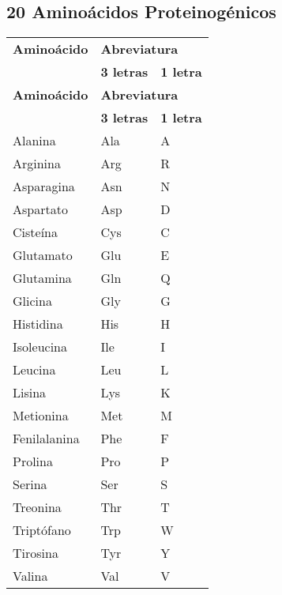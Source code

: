 \subsection*{20 Amino\'{a}cidos Proteinog\'{e}nicos} 
\begin{longtable}[l]{|l|l|l|}\hline
   \textbf{Amino\'{a}cido} & \multicolumn{2}{|l|}{\textbf{Abreviatura}} \\
  \cline{2-3}
  &\textbf{3 letras}&\textbf{1 letra}\\[0.5ex] \hline%
  \endfirsthead%
 \textbf{Amino\'{a}cido} & \multicolumn{2}{|l|}{\textbf{Abreviatura}} \\
  \cline{2-3}
  &\textbf{3 letras}&\textbf{1 letra}\\[0.5ex] \hline%
 \endhead%
\renewcommand{\arraystretch}{1.4}\label{amino}
Alanina&Ala&A\\
Arginina&Arg&R\\
Asparagina&Asn&N\\
Aspartato&Asp&D\\
Ciste\'{i}na&Cys&C\\
Glutamato&Glu&E\\
Glutamina&Gln&Q\\
Glicina&Gly&G\\
Histidina&His&H\\
Isoleucina&Ile&I\\
Leucina&Leu&L\\
Lisina&Lys&K\\
Metionina&Met&M\\
Fenilalanina&Phe&F\\
Prolina&Pro&P\\
Serina&Ser&S\\
Treonina&Thr&T\\
Tript\'{o}fano&Trp&W\\
Tirosina&Tyr&Y\\
Valina&Val&V\\ \hline

\end{longtable}


\setlength{\extrarowheight}{0pt}